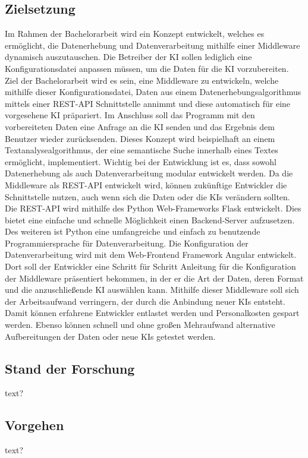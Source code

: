 \subsection{Zielsetzung}
Im Rahmen der Bachelorarbeit wird ein Konzept entwickelt, welches es ermöglicht, die
Datenerhebung und Datenverarbeitung mithilfe einer Middleware dynamisch auszutauschen.
Die Betreiber der KI sollen lediglich eine Konfigurationsdatei anpassen müssen,
um die Daten für die KI vorzubereiten. Ziel der Bachelorarbeit wird es sein, eine Middleware
zu entwickeln, welche mithilfe dieser Konfigurationsdatei, Daten aus einem Datenerhebungsalgorithmus
mittels einer REST-API Schnittstelle annimmt und diese automatisch
für eine vorgesehene KI präpariert. Im Anschluss soll das Programm mit den vorbereiteten
Daten eine Anfrage an die KI senden und das Ergebnis dem Benutzer wieder zurücksenden.
Dieses Konzept wird beispielhaft an einem Textanalysealgorithmus, der eine
semantische Suche innerhalb eines Textes ermöglicht, implementiert.
Wichtig bei der Entwicklung ist es, dass sowohl Datenerhebung als auch Datenverarbeitung
modular entwickelt werden. Da die Middleware als REST-API entwickelt wird, können
zukünftige Entwickler die Schnittstelle nutzen, auch wenn sich die Daten oder die KIs
verändern sollten.
Die REST-API wird mithilfe des Python Web-Frameworks Flask entwickelt. Dies bietet
eine einfache und schnelle Möglichkeit einen Backend-Server aufzusetzen. Des weiteren
ist Python eine umfangreiche und einfach zu benutzende Programmiersprache für
Datenverarbeitung.
Die Konfiguration der Datenverarbeitung wird mit dem Web-Frontend Framework Angular
entwickelt. Dort soll der Entwickler eine Schritt für Schritt Anleitung für die Konfiguration
der Middleware präsentiert bekommen, in der er die Art der Daten, deren Format und die
anzuschließende KI auswählen kann.
Mithilfe dieser Middleware soll sich der Arbeitsaufwand verringern, der durch die Anbindung
neuer KIs entsteht. Damit können erfahrene Entwickler entlastet werden und Personalkosten
gespart werden. Ebenso können schnell und ohne großen Mehraufwand alternative
Aufbereitungen der Daten oder neue KIs getestet werden.
\subsection{Stand der Forschung}
text?
\subsection{Vorgehen}
text?